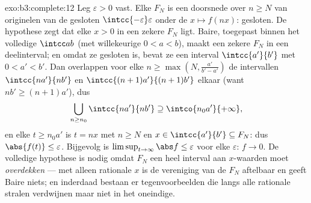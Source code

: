 \begin{solution}{exo:b3:complete:12}
Leg $\varepsilon > 0$ vast. Elke $F_N$ is een doorsnede over $n
\geq N$ van originelen van de gesloten $\intcc{-\varepsilon}
\varepsilon$ onder de  $x \mapsto f(nx)$: gesloten. De
hypothese zegt dat elke $x > 0$ in een zekere $F_N$ ligt. Baire,
toegepast binnen het volledige $\intcc ab$ (met willekeurige $0 <
a < b$), maakt een zekere $F_N$  in een deelinterval; en
omdat ze gesloten is, bevat ze een interval $\intcc{a'}{b'}$ met
$0 < a' < b'$. Dan overlappen voor elke $n \geq \max(N,
\frac{a'}{b' - a'})$ de intervallen $\intcc{na'}{nb'}$ en
$\intcc{(n+1)a'}{(n+1)b'}$ elkaar (want $nb' \geq (n+1)a'$), dus
\[
\bigcup_{n \geq n_0}\intcc{na'}{nb'} \supseteq
\intco{n_0a'}{+\infty},
\]
en elke $t \geq n_0a'$ is $t = nx$ met $n \geq N$ en $x \in
\intcc{a'}{b'} \subseteq F_N$: dus $\abs{f(t)} \leq \varepsilon$.
Bijgevolg is $\limsup_{t\to\infty}\abs f \leq \varepsilon$ voor
elke $\varepsilon$: $f \to 0$. De volledige hypothese is nodig
omdat $F_N$ een heel interval aan $x$-waarden moet
\emph{overdekken} --- met alleen rationale $x$ is de vereniging
van de $F_N$ aftelbaar en geeft Baire niets; en inderdaad bestaan
er  tegenvoorbeelden die langs alle rationale stralen
verdwijnen maar niet in het oneindige.
\end{solution}

